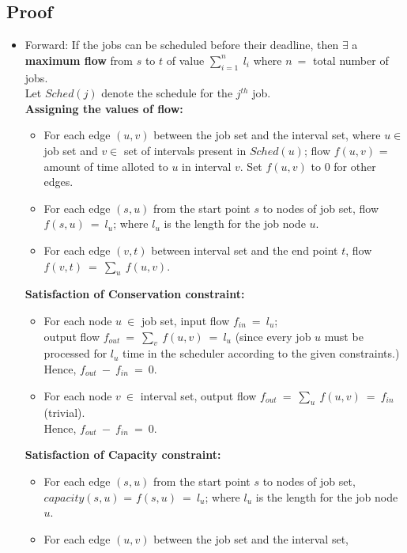 \documentclass[pdftex,a4paper,12pt]{report}
\begin{document}
\subsection{Proof}
\begin{itemize}
\item Forward: If the jobs can be scheduled before their deadline, then $\exists$ a \textbf{maximum flow} from $s$ to $t$ of value $\sum_{i=1}^{n}\ l_i$ where $n\ =$ total number of jobs.\\
Let $Sched(j)$ denote the schedule for the $j^{th}$ job.\\
 \textbf{Assigning the values of flow:}
\begin{itemize}
\item For each edge $(u,v)$ between the job set and the interval set, where $u \in$ job set and $v \in$ set of intervals present in $Sched(u)$; flow $f(u,v)$ = amount of time alloted to $u$ in interval $v$. Set $f(u,v)$ to $0$ for other edges.
\item For each edge $(s,u)$ from the start point $s$ to nodes of job set, flow $f(s,u)\ =\ l_u$; where $l_u$ is the length for the job node $u$.
\item For each edge $(v,t)$ between interval set and the end point $t$, flow $f(v,t)\ =\ \sum_{u}^{}\ f(u,v)$.
\end{itemize}
\textbf{Satisfaction of Conservation constraint:}
\begin{itemize}
\item For each node $u\ \in$ job set, input flow $f_{in}\ =\ l_u$;\\ output flow $f_{out}\ =\ \sum_{v}^{}\ f(u,v)\ =\ l_u$ (since every job $u$ must be processed for $l_u$ time in the scheduler according to the given constraints.)\\ Hence, $f_{out}\ -\ f_{in}\ =\ 0$. 
\item For each node $v\ \in$ interval set, output flow $f_{out}\ =\ \sum_{u}^{}\ f(u,v)\ =\ f_{in}$ (trivial).\\ Hence, $f_{out}\ -\ f_{in}\ =\ 0$. 
\end{itemize}
\textbf{Satisfaction of Capacity constraint:}
\begin{itemize}
\item For each edge $(s,u)$ from the start point $s$ to nodes of job set,\\ $capacity(s,u)$ = $f(s,u)\ =\ l_u$; where $l_u$ is the length for the job node $u$.
\item For each edge $(u,v)$ between the job set and the interval set,\\

\end{itemize}
\end{itemize}
\end{document}
